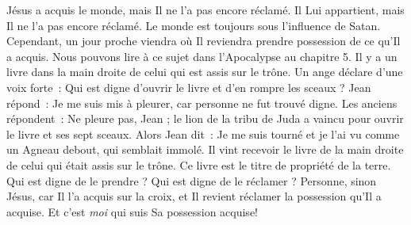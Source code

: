 Jésus a acquis le monde, mais Il ne l'a pas encore réclamé.
 Il Lui appartient, mais Il ne l'a pas encore réclamé.
 Le monde est toujours sous l'influence de Satan.
 Cependant, un jour proche viendra où Il reviendra prendre possession
 de ce qu'Il a acquis.
 Nous pouvons lire à ce sujet dans l'Apocalypse au chapitre 5.
 Il y a un livre dans la main droite de celui qui est assis sur le trône.
 Un ange déclare d'une voix forte~:
 \og Qui est digne d'ouvrir le livre et d'en rompre les sceaux ? \og
 Jean répond~: \og Je me suis mis à pleurer,
 car personne ne fut trouvé digne. \fg{}
 Les anciens répondent~: \og Ne pleure pas, Jean ;
 le lion de la tribu de Juda a vaincu pour ouvrir
 le livre et ses sept sceaux. \fg{}
 Alors Jean dit~: \og Je me suis tourné et je l'ai vu comme un Agneau debout,
 qui semblait immolé. Il vint recevoir le livre de la main droite
 de celui qui était assis sur le trône. \fg{}
 Ce livre est le titre de propriété de la terre.
 Qui est digne de le prendre ? Qui est digne de le réclamer ?
 Personne, sinon Jésus, car Il l'a acquis sur la croix, et Il revient
 réclamer la possession qu'Il a acquise.
 Et c'est \emph{moi} qui suis Sa possession acquise!



